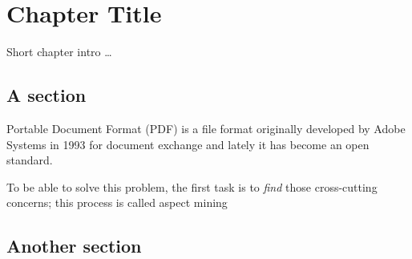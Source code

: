 \chapter{\label{cha:title}Chapter Title}

Short chapter intro \ldots

\section{A section}
Portable Document Format (PDF) is a file format originally developed by Adobe Systems in 1993 for document exchange and lately it has become an open standard.

To be able to solve this problem, the first task is to \emph{find} those cross-cutting concerns; this process is called aspect mining


\section{Another section}



